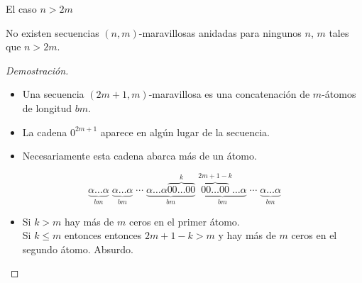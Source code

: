 \documentclass[spanish,xcolor={table}]{beamer}
\begin{document}

\begin{frame}{El caso $n > 2m$}

\begin{theorem}
  No existen secuencias $(n,m)$-maravillosas anidadas para ningunos $n$, $m$
	tales que $n > 2m$.
\end{theorem}
\pause

\begin{proof}[Demostración\nopunct]
  \begin{itemize}
    \item Una secuencia $(2m + 1,m)$-maravillosa es una concatenación
    de $m$-átomos de longitud $bm$.
    \pause
    \item La cadena $0^{2m+1}$ aparece en algún lugar de la secuencia.
    \pause
    \item Necesariamente esta cadena abarca más de un átomo.
  \end{itemize}
  \[ \underbrace{\alpha\dots\alpha}_{bm}
    \; \underbrace{\alpha\dots\alpha}_{bm} \; \cdots
    \; \underbrace{\alpha\dots\alpha\overbrace{00\dots00}^{k}}_{bm}
    \; \underbrace{\overbrace{00\dots00}^{2m+1-k}\dots\alpha}_{bm} \; \cdots
    \; \underbrace{\alpha\dots\alpha}_{bm} \]
  \begin{itemize}
    \pause
    \item Si $k > m$ hay más de $m$ ceros en el primer átomo. \\
    Si $k \leq m$ entonces entonces $2m + 1 - k > m$ y hay más de $m$ ceros en el segundo átomo. Absurdo. \qedhere
  \end{itemize}
\end{proof}

\end{frame}

\end{document}
